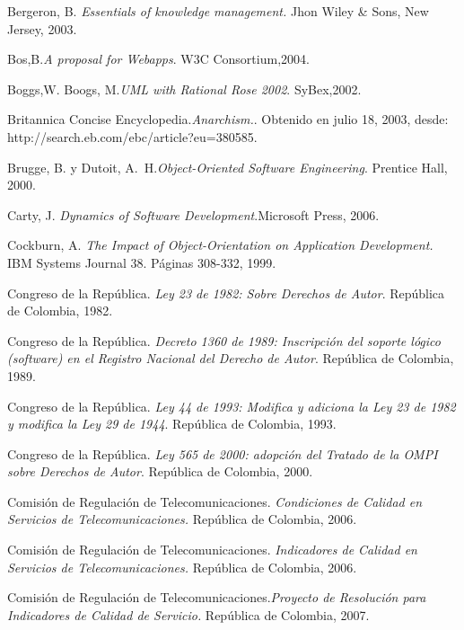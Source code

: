 \begin{thebibliography}{}
 Bergeron, B. \textit{Essentials of knowledge management.} Jhon Wiley \& Sons, New Jersey, 2003.

 Bos,B.\textit{A proposal for Webapps}. W3C Consortium,2004.

 Boggs,W. Boogs, M.\textit{UML with Rational Rose 2002}. SyBex,2002.

 Britannica Concise Encyclopedia.\textit{Anarchism.}. Obtenido en julio 18, 2003, desde:    http://search.eb.com/ebc/article?eu=380585.

 Brugge, B. y Dutoit, A.~H.\textit{Object-Oriented Software Engineering}. Prentice Hall, 2000.

 Carty, J. \textit{Dynamics of Software Development}.Microsoft Press, 2006.

 Cockburn, A. \textit{The Impact of Object-Orientation on Application Development.} IBM Systems Journal 38. Páginas 308-332, 1999.

 Congreso de la República. \textit{Ley 23 de 1982: Sobre Derechos de Autor}. República de Colombia, 1982.

 Congreso de la República. \textit{Decreto 1360 de 1989: Inscripción del soporte lógico (software) en el Registro Nacional del Derecho de Autor}. República de Colombia, 1989.

 Congreso de la República. \textit{Ley 44 de 1993: Modifica y adiciona la Ley 23 de 1982 y modifica la Ley 29 de 1944}. República de Colombia, 1993.

 Congreso de la República. \textit{Ley 565 de 2000: adopción del Tratado de la OMPI sobre Derechos de Autor}. República de Colombia, 2000.

 Comisión de Regulación de Telecomunicaciones. \textit{Condiciones de Calidad en Servicios de Telecomunicaciones.} República de Colombia, 2006. 

 Comisión de Regulación de Telecomunicaciones. \textit{Indicadores de Calidad en Servicios de Telecomunicaciones.} República de Colombia, 2006. 

 Comisión de Regulación de Telecomunicaciones.\textit{Proyecto de Resolución para Indicadores de Calidad de Servicio.} República de Colombia, 2007.


\end{thebibliography}
